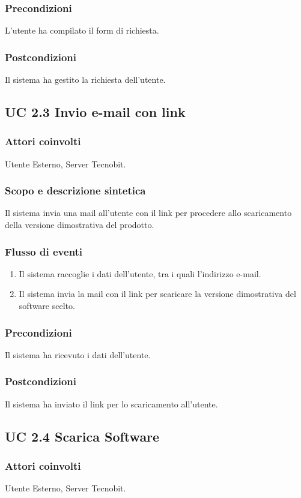 \subsubsection*{Precondizioni} L'utente ha compilato il form di richiesta.
\subsubsection*{Postcondizioni} Il sistema ha gestito la richiesta dell'utente.

\subsection*{UC 2.3 Invio e-mail con link}
\subsubsection*{Attori coinvolti} Utente Esterno, Server Tecnobit.
\subsubsection*{Scopo e descrizione sintetica}
Il sistema invia una mail all'utente con il link per procedere allo scaricamento della versione dimostrativa del prodotto.
\subsubsection*{Flusso di eventi}
\begin{enumerate}
\item Il sistema raccoglie i dati dell'utente, tra i quali l'indirizzo e-mail.
\item Il sistema invia la mail con il link per scaricare la versione dimostrativa del software scelto.
\end{enumerate}
\subsubsection*{Precondizioni} Il sistema ha ricevuto i dati dell'utente.
\subsubsection*{Postcondizioni} Il sistema ha inviato il link per lo scaricamento all'utente.

\subsection*{UC 2.4 Scarica Software}
\subsubsection*{Attori coinvolti} Utente Esterno, Server Tecnobit.
